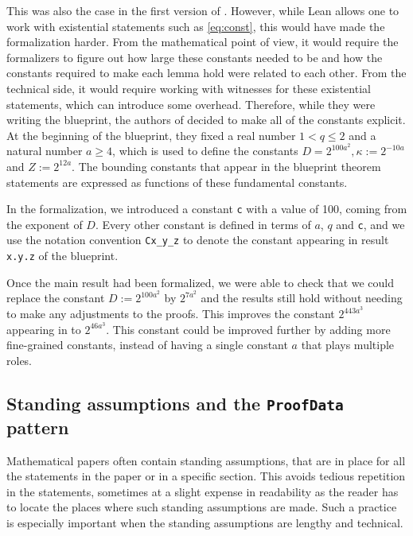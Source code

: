 \documentclass[12pt, reqno]{amsart}
\let\lean\lstinline
\theoremstyle{definition}
\theoremstyle{plain}
\begin{document}
This was also the case in the first version of \cite{ThieleCarlesonPreprint}. However, while Lean allows one to work with existential statements such as \eqref{eq:const}, this would have made the formalization harder. From the mathematical point of view, it would require the formalizers to figure out how large these constants needed to be and how the constants required to make each lemma hold were related to each other. From the technical side, it would require working with witnesses for these existential statements, which can introduce some overhead.
Therefore, while they were writing the blueprint, the authors of \cite{ThieleCarlesonPreprint} decided to make all of the constants explicit. At the beginning of the blueprint, they fixed a real number $1 < q \le 2$ and a natural number $a \ge 4$, which is used to define the constants $D = 2^{100a^2}, \kappa := 2 ^{-10a}$ and $Z := 2^{12a}$. The bounding constants that appear in the blueprint theorem statements are expressed as functions of these fundamental constants.

In the formalization, we introduced a constant \lean{c} with a value of 100, coming from the exponent of $D$.
Every other constant is defined in terms of $a$, $q$ and \lean{c}, and we use the notation convention \lean{Cx_y_z} to denote the constant appearing in result \lean{x.y.z} of the blueprint.

Once the main result had been formalized, we were able to check that we could replace the constant $D := 2^{100a^2}$ by $2^{7a^2}$ and the results still hold without needing to make any adjustments to the proofs. This improves the constant $2^{443a^3}$ appearing in  to $2^{46a^3}$.
This constant could be improved further by adding more fine-grained constants,
instead of having a single constant $a$ that plays multiple roles.


\subsection{Standing assumptions and the \texttt{ProofData} pattern}\label{subsec:proof_data}

Mathematical papers often contain standing assumptions, that are in place for
all the statements in the paper or in a specific section. This avoids
tedious repetition in the statements, sometimes at a slight expense in
readability as the reader has to locate the places where such standing
assumptions are made. Such a practice is especially important when the
standing assumptions are lengthy and technical.
\end{document}
